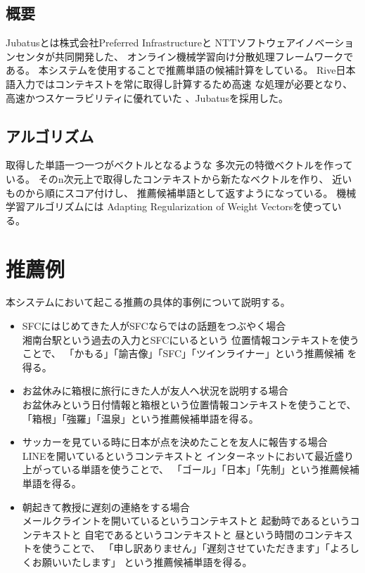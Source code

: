 \subsection{概要}
Jubatus\cite{jubatus}とは株式会社Preferred Infrastructureと
NTTソフトウェアイノベーションセンタが共同開発した、
オンライン機械学習向け分散処理フレームワークである。
本システムを使用することで推薦単語の候補計算をしている。
Rive日本語入力ではコンテキストを常に取得し計算するため高速
な処理が必要となり、
高速かつスケーラビリティに優れていた
\cite{岡野原大輔:2013-01-01}、Jubatusを採用した。

\subsection{アルゴリズム}
取得した単語一つ一つがベクトルとなるような
多次元の特徴ベクトルを作っている。
そのn次元上で取得したコンテキストから新たなベクトルを作り、
近いものから順にスコア付けし、
推薦候補単語として返すようになっている。
機械学習アルゴリズムには
Adapting Regularization of Weight Vectors\cite{AROW}を使っている。

\section{推薦例}
本システムにおいて起こる推薦の具体的事例について説明する。
\begin{itemize}
  \item SFCにはじめてきた人がSFCならではの話題をつぶやく場合\mbox{}\\
    湘南台駅という過去の入力とSFCにいるという
    位置情報コンテキストを使うことで、
    「かもる」「諭吉像」「SFC」「ツインライナー」という推薦候補
    を得る。
  \item お盆休みに箱根に旅行にきた人が友人へ状況を説明する場合\mbox{}\\
    お盆休みという日付情報と箱根という位置情報コンテキストを使うことで、
    「箱根」「強羅」「温泉」という推薦候補単語を得る。
  \item サッカーを見ている時に日本が点を決めたことを友人に報告する場合\mbox{}\\
    LINEを開いているというコンテキストと
    インターネットにおいて最近盛り上がっている単語を使うことで、
    「ゴール」「日本」「先制」という推薦候補単語を得る。
  \item 朝起きて教授に遅刻の連絡をする場合\mbox{}\\
    メールクライントを開いているというコンテキストと
    起動時であるというコンテキストと
    自宅であるというコンテキストと
    昼という時間のコンテキストを使うことで、
    「申し訳ありません」「遅刻させていただきます」「よろしくお願いいたします」
    という推薦候補単語を得る。
\end{itemize}
